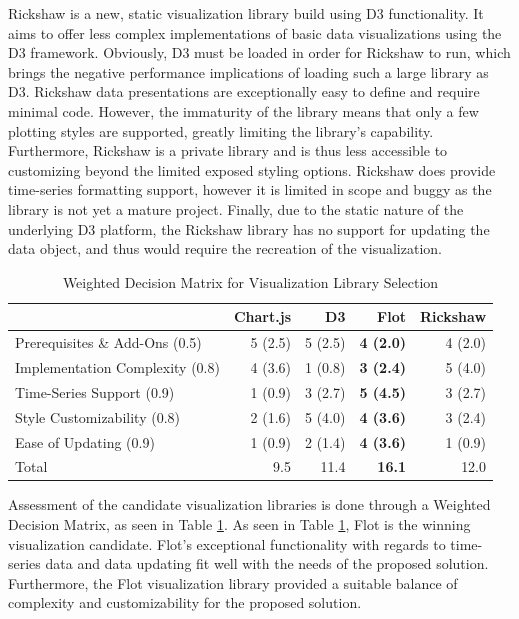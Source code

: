 \documentclass{report}
\begin{document}
Rickshaw is a new, static visualization library build using D3 functionality. It aims to offer less complex implementations of basic data visualizations using the D3 framework. Obviously, D3 must be loaded in order for Rickshaw to run, which brings the negative performance implications of loading such a large library as D3. Rickshaw data presentations are exceptionally easy to define and require minimal code. However, the immaturity of the library means that only a few plotting styles are supported, greatly limiting the library's capability. Furthermore, Rickshaw is a private library and is thus less accessible to customizing beyond the limited exposed styling options. Rickshaw does provide time-series formatting support, however it is limited in scope and buggy as the library is not yet a mature project. Finally, due to the static nature of the underlying D3 platform, the Rickshaw library has no support for updating the data object, and thus would require the recreation of the visualization.

\begin{table}
\centering
    \begin{tabular}{l | r r r r}
    ~                               & Chart.js & D3      & \textbf{Flot}    & Rickshaw \\ \hline
    Prerequisites \& Add-Ons (0.5)  & 5 (2.5)  & 5 (2.5) & \textbf{4 (2.0)} & 4 (2.0)  \\
    Implementation Complexity (0.8) & 4 (3.6)  & 1 (0.8) & \textbf{3 (2.4)} & 5 (4.0)  \\
    Time-Series Support (0.9)       & 1 (0.9)  & 3 (2.7) & \textbf{5 (4.5)} & 3 (2.7)  \\
    Style Customizability (0.8)     & 2 (1.6)  & 5 (4.0) & \textbf{4 (3.6)} & 3 (2.4)  \\
    Ease of Updating (0.9)          & 1 (0.9)  & 2 (1.4) & \textbf{4 (3.6)} & 1 (0.9)  \\ \hline
    Total                           & 9.5      & 11.4    & \textbf{16.1}    & 12.0     \\
    \end{tabular}
\caption{Weighted Decision Matrix for Visualization Library Selection}
\label{table:visualization-matrix}
\end{table}

Assessment of the candidate visualization libraries is done through a Weighted Decision Matrix, as seen in Table \ref{table:visualization-matrix}. As seen in Table \ref{table:visualization-matrix}, Flot is the winning visualization candidate. Flot's exceptional functionality with regards to time-series data and data updating fit well with the needs of the proposed solution. Furthermore, the Flot visualization library provided a suitable balance of complexity and customizability for the proposed solution.
\end{document}
